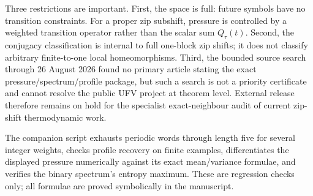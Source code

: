 Three restrictions are important.  First, the space is full: future symbols
have no transition constraints.  For a proper zip subshift, pressure is
controlled by a weighted transition operator rather than the scalar sum
$Q_\tau(t)$.  Second, the conjugacy classification is internal to full
one-block zip shifts; it does not classify arbitrary finite-to-one local
homeomorphisms.  Third, the bounded source search through 26 August 2026 found
no primary article stating the exact pressure/spectrum/profile package, but
such a search is not a priority certificate and cannot resolve the public UFV
project at theorem level.  External release therefore remains on hold for the
specialist exact-neighbour audit of current zip-shift thermodynamic work.

The companion script exhausts periodic words through length five for several
integer weights, checks profile recovery on finite examples, differentiates
the displayed pressure numerically against its exact mean/variance formulae,
and verifies the binary spectrum's entropy maximum.  These are regression
checks only; all formulae are proved symbolically in the manuscript.

